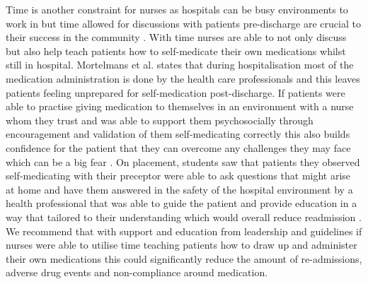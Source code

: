 \documentclass[british,12pt,a4paper]{article}
\begin{document}
	Time is another constraint for nurses as hospitals can be busy environments to work in but time allowed for discussions with patients pre-discharge are crucial to their success in the community \parencite{Sanjai2019}. With time nurses are able to not only discuss but also help teach patients how to self-medicate their own medications whilst still in hospital. Mortelmans et al. \citeauthor{Mortelmans2021} states that during hospitalisation most of the medication administration is done by the health care professionals and this leaves patients feeling unprepared for self-medication post-discharge. If patients were able to practise giving medication to themselves in an environment with a nurse whom they trust and was able to support them psychosocially through encouragement and validation of them self-medicating correctly this also builds confidence for the patient that they can overcome any challenges they may face which can be a big fear \parencite{Sanjai2019}. On placement, students saw that patients they observed self-medicating with their preceptor were able to ask questions that might arise at home and have them answered in the safety of the hospital environment by a health professional that was able to guide the patient and provide education in a way that tailored to their understanding which would overall reduce readmission \parencite{Sanjai2019}. We recommend that with support and education from leadership and guidelines if nurses were able to utilise time teaching patients how to draw up and administer their own medications this could significantly reduce the amount of re-admissions, adverse drug events and non-compliance around medication.
\end{document}
